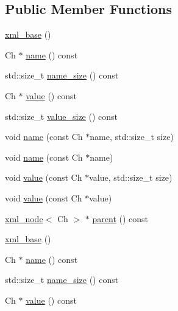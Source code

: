 \subsection*{Public Member Functions}
\begin{DoxyCompactItemize}
\item 
\mbox{\hyperlink{classrapidxml_1_1xml__base_a23e7f7aac02d17a0a01afb597e4b966b}{xml\+\_\+base}} ()
\item 
Ch $\ast$ \mbox{\hyperlink{classrapidxml_1_1xml__base_aef8ae147fbee59209f714274afc80dc4}{name}} () const
\item 
std\+::size\+\_\+t \mbox{\hyperlink{classrapidxml_1_1xml__base_a20c8ffbe0c7a0b4231681ab8b99330a4}{name\+\_\+size}} () const
\item 
Ch $\ast$ \mbox{\hyperlink{classrapidxml_1_1xml__base_a6af65de5e59ac497cd69838f8a89d602}{value}} () const
\item 
std\+::size\+\_\+t \mbox{\hyperlink{classrapidxml_1_1xml__base_a2eb123d471b1567fa4832b6ee2b75493}{value\+\_\+size}} () const
\item 
void \mbox{\hyperlink{classrapidxml_1_1xml__base_ae55060ae958c6e6465d6c8db852ec6ce}{name}} (const Ch $\ast$name, std\+::size\+\_\+t size)
\item 
void \mbox{\hyperlink{classrapidxml_1_1xml__base_a4611ddc82ac83a527c65606600eb2a0d}{name}} (const Ch $\ast$name)
\item 
void \mbox{\hyperlink{classrapidxml_1_1xml__base_a3b183c2db7022a6d30494dd2f0ac11e9}{value}} (const Ch $\ast$value, std\+::size\+\_\+t size)
\item 
void \mbox{\hyperlink{classrapidxml_1_1xml__base_a81e63ec4bfd2d7ef0a6c2ed49be6e623}{value}} (const Ch $\ast$value)
\item 
\mbox{\hyperlink{classrapidxml_1_1xml__node}{xml\+\_\+node}}$<$ Ch $>$ $\ast$ \mbox{\hyperlink{classrapidxml_1_1xml__base_aa807062868d671a8c798d9d1bf016988}{parent}} () const
\item 
\mbox{\hyperlink{classrapidxml_1_1xml__base_a23e7f7aac02d17a0a01afb597e4b966b}{xml\+\_\+base}} ()
\item 
Ch $\ast$ \mbox{\hyperlink{classrapidxml_1_1xml__base_aef8ae147fbee59209f714274afc80dc4}{name}} () const
\item 
std\+::size\+\_\+t \mbox{\hyperlink{classrapidxml_1_1xml__base_a20c8ffbe0c7a0b4231681ab8b99330a4}{name\+\_\+size}} () const
\item 
Ch $\ast$ \mbox{\hyperlink{classrapidxml_1_1xml__base_a6af65de5e59ac497cd69838f8a89d602}{value}} () const
\item 

\end{DoxyCompactItemize}

